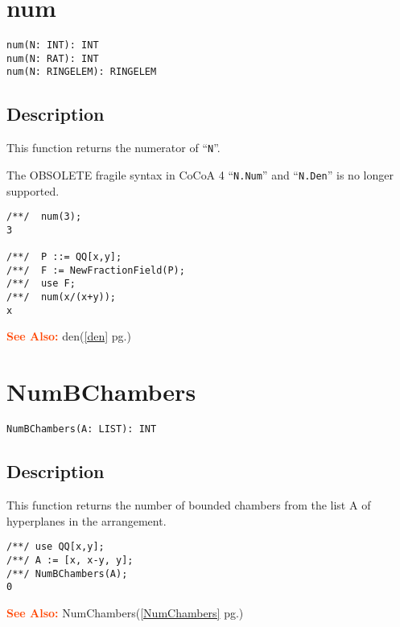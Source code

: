 \documentclass[a4paper]{mybook}
\newenvironment{command}{}{} %
\newcommand\SeeAlso{\par\textcolor{OrangeRed}{\textbf{\large See Also: }}}
\begin{document}
\section{num}
\label{num}
\begin{command} %


\begin{Verbatim}[label=syntax, rulecolor=\color{MidnightBlue},
frame=single]
num(N: INT): INT
num(N: RAT): INT
num(N: RINGELEM): RINGELEM
\end{Verbatim}


\subsection*{Description}

This function returns the numerator of ``\verb&N&''.
\par 
The OBSOLETE fragile syntax in CoCoA 4 ``\verb&N.Num&'' and ``\verb&N.Den&'' is no
longer supported.
\begin{Verbatim}[label=example, rulecolor=\color{PineGreen}, frame=single]
/**/  num(3);
3

/**/  P ::= QQ[x,y];
/**/  F := NewFractionField(P);
/**/  use F;
/**/  num(x/(x+y));
x
\end{Verbatim}


\SeeAlso %
  den(\ref{den} pg.\pageref{den})
\end{command} %

\section{NumBChambers}
\label{NumBChambers}
\begin{command} %


\begin{Verbatim}[label=syntax, rulecolor=\color{MidnightBlue},
frame=single]
NumBChambers(A: LIST): INT 
\end{Verbatim}


\subsection*{Description}

This function returns the number of bounded chambers from the list A of hyperplanes in the arrangement.
\begin{Verbatim}[label=example, rulecolor=\color{PineGreen}, frame=single]
/**/ use QQ[x,y];	
/**/ A := [x, x-y, y];
/**/ NumBChambers(A);
0
\end{Verbatim}


\SeeAlso %
  NumChambers(\ref{NumChambers} pg.\pageref{NumChambers})
\end{command} %
\end{document}
